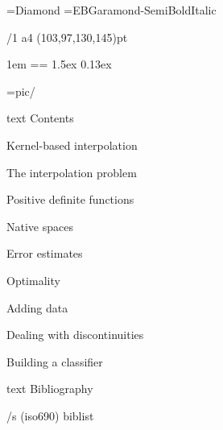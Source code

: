 \useOpTeX  %


\hyperlinks \Black \Black
{}

\enlang
\fontfam[TypewriterMT]
\fontfam[GaramondMT]\let\semibold\relax \typosize[12.5/14.7]%



\font\symbols=Diamond %
\def\QED{\hbox{\symbols\resizethefont \,❖}}
\font\boldmathfont=EBGaramond-SemiBoldItalic
\famvardef\tt{\TypewriterMT{}\rm}


\margins/1 a4 (103,97,130,145)pt


\parindent 1em
\iindent=\parindent \ttindent=\parindent
\parskip 1.5ex
 0.13ex

\picdir={pic/}

\bgroup
\let\_mtext\ignoreit
\nonum\notoc\chap Contents
\egroup
\tocpage

\chap Kernel-based interpolation

\sec The interpolation problem


\sec[positivesec] Positive definite functions


\sec Native spaces


\sec[errorsec] Error estimates


\sec Optimality


\sec[addingsec] Adding data


\chap Dealing with discontinuities

\sec[buildingsec] Building a classifier










\bgroup
\let\_mtext\ignoreit
\nonum\chap Bibliography

\def\_opwarning#1{}
\usebib/s (iso690) biblist
\egroup

\bye
